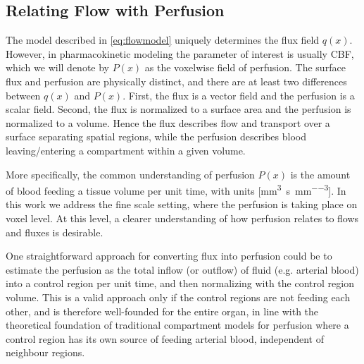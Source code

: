 \documentclass[journal,twocolumn]{IEEEtran}
\newcommand{\Perf}{P}
\newcommand{\siQmm}{\milli\meter\cubed\per\second\per\milli\meter\cubed}
\begin{document}
	 
	\subsection{Relating Flow with Perfusion}\label{sec:flux2perf}
	The model described in \eqref{eq:flowmodel} uniquely determines the flux field $q(x)$. 
	However, in pharmacokinetic modeling the parameter of interest is usually CBF, which we will denote by $\Perf (x)$ as the voxelwise field of perfusion. The surface flux and perfusion are physically distinct, and there are at least two differences between $q(x)$ and $\Perf (x)$. 
	First, the flux is a vector field and the perfusion is a scalar field. 
	Second, the flux is normalized to a surface area and the perfusion is normalized to a volume. 
	Hence the flux describes flow and transport over a surface separating spatial regions, while the perfusion describes blood leaving/entering a compartment within a given volume. 
	
	

	More specifically,
	the common understanding of perfusion
	 $\Perf (x)$ is the amount of blood feeding a tissue volume per unit time, with units [\si{\siQmm}]. 
	 In this work we address the  fine scale setting, where the perfusion is taking place on voxel level. At this level, a clearer understanding of how perfusion relates to flows and fluxes is desirable.  
	 
	One straightforward approach for converting flux into perfusion could be to estimate the perfusion as the total inflow (or outflow) of fluid (e.g. arterial blood) into a control region per unit time, and then normalizing with the control region volume. 
	This is a valid approach only if the control regions are not feeding each other, and is therefore well-founded for the entire organ,
	in line with the theoretical foundation of traditional compartment models for perfusion where a control region has its own source of feeding arterial blood, independent of neighbour regions. 
	
\end{document}
